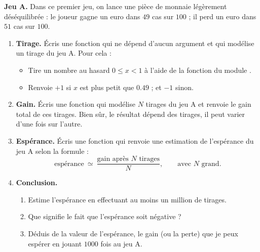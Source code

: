 \documentclass[11pt,class=report,crop=false]{standalone}
\begin{document}
\begin{activite}


\textbf{Jeu A.} Dans ce premier jeu, on lance une pièce de monnaie légèrement déséquilibrée : le joueur gagne un euro dans $49$ cas sur $100$ ; il perd un euro dans $51$ cas sur $100$.

\begin{enumerate}
  \item \textbf{Tirage.}
  \'Ecris une fonction  qui ne dépend d'aucun argument et qui modélise un tirage du jeu A. Pour cela :
  \begin{itemize}
    \item Tire un nombre au hasard $0 \le x < 1$ à l'aide de la fonction  du module .
    \item Renvoie $+1$ si $x$ est plus petit que $0.49$ ; et $-1$ sinon.
  \end{itemize}
  
  
  \item \textbf{Gain.} \'Ecris une fonction  qui modélise $N$ tirages du jeu A et renvoie le gain total de ces tirages. Bien sûr, le résultat dépend des tirages, il peut varier d'une fois sur l'autre.
  
  \item \textbf{Espérance.} \'Ecris une fonction  qui renvoie une estimation de l'espérance du jeu A selon la formule :
  $$\text{espérance} \  \simeq \  \frac{\text{gain après $N$ tirages}}{N}, \qquad \text{avec $N$ grand}.$$
  
  \item \textbf{Conclusion.}
  \begin{enumerate}
    \item Estime l'espérance en effectuant au moins un million de tirages.
    \item Que signifie le fait que l'espérance soit négative ?
    \item Déduis de la valeur de l'espérance, le gain (ou la perte) que je peux espérer en jouant $1000$ fois au jeu A.
  \end{enumerate}

\end{enumerate}

\end{activite}
  
  
\end{document}
